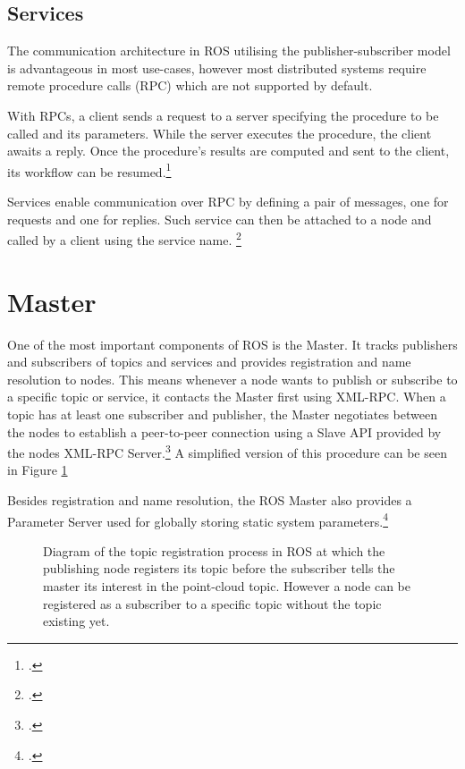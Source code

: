 \subsection{Services}
The communication architecture in ROS utilising the publisher-subscriber model is advantageous in most use-cases, however most distributed systems require remote procedure calls (RPC) which are not supported by default.

With RPCs, a client sends a request to a server specifying the procedure to be called and its parameters. While the server executes the procedure, the client awaits a reply. Once the procedure's results are computed and sent to the client, its workflow can be resumed.\footcite[Page 3]{rfc1831}

Services enable communication over RPC by defining a pair of messages, one for requests and one for replies. Such service can then be attached to a node and called by a client using the service name. \footcite{openSourceRoboticsFoundationServicesNodate}




\section{Master}
One of the most important components of ROS is the Master. It tracks publishers and subscribers of topics and services and provides registration and name resolution to nodes. This means whenever a node wants to publish or subscribe to a specific topic or service, it contacts the Master first using XML-RPC. When a topic has at least one subscriber and publisher, the Master negotiates between the nodes to establish a peer-to-peer connection using a Slave API provided by the nodes XML-RPC Server.\footcite{openSourceRoboticsFoundationMasterNodate} A simplified version of this procedure can be seen in Figure \ref{fig:ros_master_reg}

Besides registration and name resolution, the ROS Master also provides a Parameter Server used for globally storing static system parameters.\footcite{openSourceRoboticsFoundationParameterServerNodate}
\begin{figure}[]
	\centering
	
	\caption{Diagram of the topic registration process in ROS at which the publishing node registers its topic before the subscriber tells the master its interest in the point-cloud topic. However a node can be registered as a subscriber to a specific topic without the topic existing yet.}
	\label{fig:ros_master_reg}
\end{figure}



